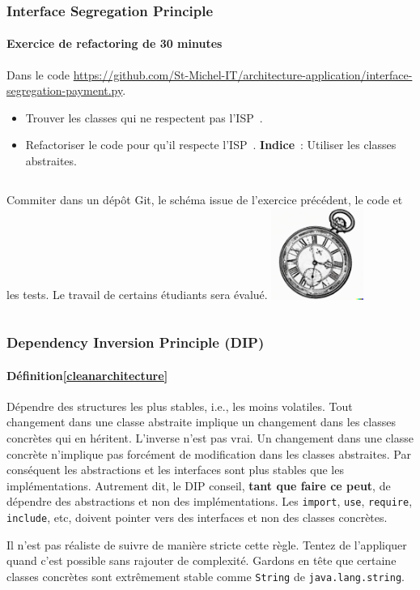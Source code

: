 \documentclass{beamer}
\begin{document}
    \begin{frame}
        \transdissolve
        \frametitle{Interface Segregation Principle}
        \framesubtitle{Exercice \execcounterdispinc{} de refactoring de 30 minutes}
        Dans le code \url{https://github.com/St-Michel-IT/architecture-application/interface-segregation-payment.py}.
        \begin{itemize}
            \item Trouver les classes qui ne respectent pas l'ISP~.
            \item Refactoriser le code pour qu'il respecte l'ISP~. \textbf{Indice}~: Utiliser les classes abstraites.
        \end{itemize}
        \bigbreak
        \begin{columns}
            Commiter dans un dépôt Git, le schéma issue de l'exercice précédent, le code et les tests.
            \bigbreak
            Le travail de certains étudiants sera évalué.
            \centering
            \includegraphics[width=3cm]{image/engraving-of-an-old-watch}
        \end{columns}
    \end{frame}

    \begin{frame}
        \transdissolve
        \frametitle{Dependency Inversion Principle (DIP)}
        \framesubtitle{Définition\cref{cleanarchitecture}}
        Dépendre des structures les plus stables, i.e., les moins volatiles.
        \bigbreak
        Tout changement dans une classe abstraite implique un changement dans les classes concrètes qui en héritent.
        L'inverse n'est pas vrai.
        Un changement dans une classe concrète n'implique pas forcément de modification dans les classes abstraites.
        \bigbreak
        Par conséquent les abstractions et les interfaces sont plus stables que les implémentations.
        \bigbreak
        Autrement dit, le DIP conseil, \textbf{tant que faire ce peut}, de dépendre des abstractions et non des implémentations.
        Les \lstinline{import}, \lstinline{use}, \lstinline{require}, \lstinline{include}, etc, doivent pointer vers des interfaces et non des classes concrètes.
        \begin{footnotesize}
            \begin{dangercolorbox}
                Il n'est pas réaliste de suivre de manière stricte cette règle.
                Tentez de l'appliquer quand c'est possible sans rajouter de complexité.
                Gardons en tête que certaine classes concrètes sont extrêmement stable comme \lstinline{String} de \lstinline{java.lang.string}.
            \end{dangercolorbox}
        \end{footnotesize}
    \end{frame}
\end{document}
